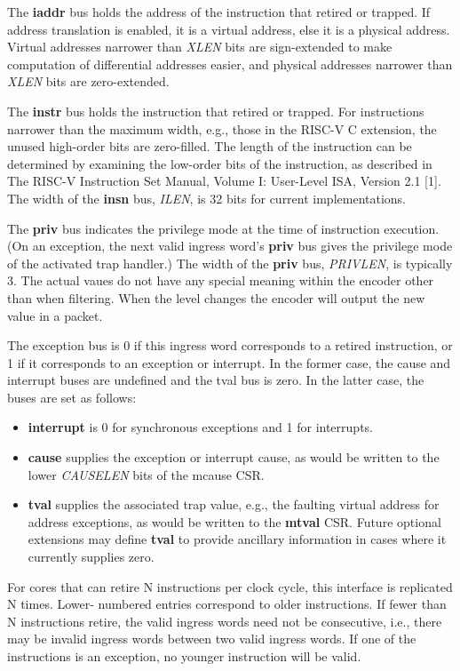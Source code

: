 The \textbf {iaddr} bus holds the address of the instruction that
retired or trapped. If address translation is enabled, it is a virtual
address, else it is a physical address. Virtual addresses narrower
than \textit {XLEN} bits are sign-extended to make computation of differential
addresses easier, and physical addresses narrower than \textit {XLEN} bits are
zero-extended.

The \textbf {instr} bus holds the instruction that retired or
trapped. For instructions narrower than the maximum width, e.g., those
in the RISC-V C extension, the unused high-order bits are
zero-filled. The length of the instruction can be determined by
examining the low-order bits of the instruction, as described in The
RISC-V Instruction Set Manual, Volume I: User-Level ISA, Version 2.1
[1]. The width of the \textbf {insn} bus, \textit {ILEN}, is 32 bits for current
implementations.

The \textbf {priv} bus indicates the privilege mode at the time of instruction
execution. (On an exception, the next valid ingress word's \textbf {priv} bus
gives the privilege mode of the activated trap handler.) The width of
the \textbf {priv} bus, \textit {PRIVLEN}, is typically 3. The actual vaues do not have any special meaning within the encoder other than when filtering. When the level changes the encoder will output the new value in a packet.

The exception bus is 0 if this ingress word corresponds to a retired
instruction, or 1 if it corresponds to an exception or interrupt.  In
the former case, the cause and interrupt buses are undefined and the
tval bus is zero.  In the latter case, the buses are set as
follows:

\begin{itemize}
  \item \textbf {interrupt} is 0 for synchronous exceptions and 1 for
    interrupts.
  \item \textbf {cause} supplies the exception or interrupt cause, as
    would be written to the lower \textit {CAUSELEN} bits of the mcause CSR.
  \item \textbf {tval} supplies the associated trap value, e.g., the
    faulting virtual address for address exceptions, as would be
    written to the \textbf {mtval} CSR. Future optional extensions may define \textbf {tval} to provide ancillary information in cases where it currently supplies zero.  
\end{itemize}

For cores that can retire N instructions per clock cycle, this
interface is replicated N times.  Lower- numbered entries correspond
to older instructions.  If fewer than N instructions retire, the valid
ingress words need not be consecutive, i.e., there may be invalid
ingress words between two valid ingress words. If one of the
instructions is an exception, no younger instruction will be valid.



